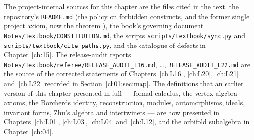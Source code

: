 The project-internal sources for this chapter are the files cited in the text, the
repository's \texttt{README.md} (the policy on forbidden constructs, and the
former single project axiom, now the theorem ), the book's governing document \texttt{Notes/Textbook/CONSTITUTION.md}, the scripts
\texttt{scripts/textbook/sync.py} and \texttt{scripts/textbook/cite\_paths.py}, and the catalogue of defects in Chapter~\ref{ch:15}. The
release-audit reports \texttt{Notes/Textbook/referee/RELEASE\_AUDIT\_L16.md}, \dots, \texttt{RELEASE\_AUDIT\_L22.md} are
the source of the corrected statements of Chapters~\ref{ch:L16}, \ref{ch:L20}, \ref{ch:L21} and~\ref{ch:L22}
recorded in Section~\ref{ch01:sec:map}. The
definitions that an earlier version of this chapter presented in full --- formal calculus, the
vertex algebra axioms, the Borcherds identity, reconstruction, modules, automorphisms, ideals,
invariant forms, Zhu's algebra and intertwiners --- are now presented in Chapters~\ref{ch:L01},
\ref{ch:L03}, \ref{ch:L04} and~\ref{ch:L12}, and the orbifold subalgebra in Chapter~\ref{ch:04}.

\endgroup
